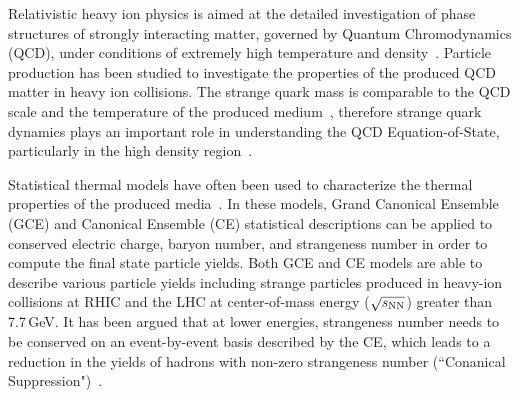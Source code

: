 \documentclass[%
 reprint,	
showpacs,
 amsmath,amssymb,
 aps,
 prc,
]{revtex4-1}
\begin{document}
\maketitle


Relativistic heavy ion physics is aimed at the detailed investigation of phase structures of strongly interacting matter, governed by Quantum Chromodynamics (QCD), under conditions of extremely high temperature and density~\cite{akiba2015hot,StarWhitePaper}. Particle production has been studied to investigate the properties of the produced QCD matter in heavy ion collisions. 
The strange quark mass %
is comparable to the QCD scale 
and
the temperature of the produced medium~\cite{Rafelski:1982pu,Koch:1986ud}, therefore strange quark dynamics plays an important role in understanding the QCD Equation-of-State, particularly in the high density region~\cite{KO_sQM17,Danielewicz1592,Tetyana_ICNN,KO.PhysRevLett.55.2661,HADES.Ks2019457,CASSING.openCharm.2001753}. 

Statistical thermal models have often been used to characterize the thermal properties of the produced media~\cite{BraunMunzinger:2003zd,Redlich_CE}. In these models, Grand Canonical Ensemble (GCE) and Canonical Ensemble (CE) statistical descriptions can be applied to conserved electric charge, baryon number, and strangeness number in order to compute the final state particle yields. Both GCE and CE models are able to describe various particle yields including strange particles produced in heavy-ion collisions at RHIC and the LHC at center-of-mass energy ($\sqrt{s_{\rm NN}}$) greater than 7.7\,GeV. It has been argued that at lower energies, strangeness number needs to be conserved on an event-by-event basis described by the CE, which leads to a reduction in the yields of hadrons with non-zero strangeness number (``Conanical Suppression")~\cite{Redlich:2001kb}.
\end{document}
